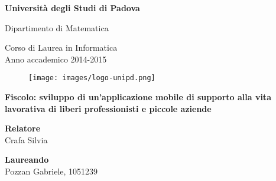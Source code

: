 \documentclass[12pt]{article}
\begin{document}
\begin{titlepage}
\begin{center}

\begin{LARGE}
\textbf{Università degli Studi di Padova} \\
\end{LARGE}

\vspace{10pt}

\begin{large}
Dipartimento di Matematica \\
\end{large}

\vspace{10pt}

\begin{large}
Corso di Laurea in Informatica \\
Anno accademico 2014-2015
\end{large}

\vspace{20pt}

\begin{figure}[htbp]
\begin{center}
\texttt{[image: images/logo-unipd.png]}
\end{center}
\end{figure}

\vspace{0pt}

\begin{LARGE}
\begin{center}
\textbf{Fiscolo: sviluppo di un'applicazione mobile di supporto alla vita lavorativa di liberi professionisti e piccole aziende}
\end{center}
\end{LARGE}

\vspace{15pt}

\vspace{0pt}

\begin{large}
\begin{flushleft}
\textbf{Relatore}\\
\vspace{5pt}
Crafa Silvia
\end{flushleft}

\vspace{0pt}

\begin{flushright}
\textbf{Laureando}\\
\vspace{5pt}
Pozzan Gabriele, 1051239
\end{flushright}
\end{large}

\end{center}
\end{titlepage}

\tableofcontents
\listoftables
\listoffigures





\appendix



\end{document}
